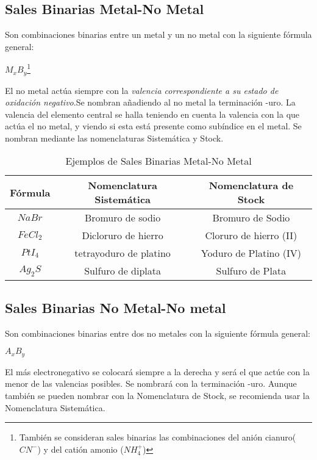 \documentclass[11pt,fleqn]{book} %
\begin{document}
\subsection{Sales Binarias Metal-No Metal}
Son combinaciones binarias entre un metal y un no metal con la siguiente fórmula general:\\
\begin{center}
$M_{x}B_y$\footnote{También se consideran sales binarias las combinaciones del anión cianuro($CN^{-}$) y del catión amonio ($NH^{+}_4$)}
\end{center}
El no metal actúa siempre con la \emph{valencia correspondiente a su estado de oxidación negativo}.Se nombran añadiendo al no metal la terminación -uro. La valencia del elemento central se halla teniendo en cuenta la valencia con la que actúa el no metal, y viendo si esta está presente como subíndice en el metal. Se nombran mediante las nomenclaturas Sistemática y Stock.
\begin{table}[h!]
	\centering
	\begin{tabular}{c|cc}
		Fórmula&Nomenclatura Sistemática&Nomenclatura de Stock\\ \hline
		$NaBr$&Bromuro de sodio&Bromuro de Sodio\\ 
		$FeCl_{2}$&Dicloruro de hierro&Cloruro de hierro (II)\\
		$PtI_{4}$&tetrayoduro de platino&Yoduro de Platino (IV)\\
		$Ag_{2}S$&Sulfuro de diplata&Sulfuro de Plata\\ \hline
	\end{tabular}
	\caption{Ejemplos de Sales Binarias Metal-No Metal}
\end{table}
\subsection{Sales Binarias No Metal-No metal}
Son combinaciones binarias entre dos no metales con la siguiente fórmula general:\\
\begin{center}
	$A_{x}B_y$
\end{center}
El más electronegativo se colocará siempre a la derecha y será el que actúe con la menor de las valencias posibles. Se nombrará con la terminación -uro. Aunque también se pueden nombrar con la Nomenclatura de Stock, se recomienda usar la Nomenclatura Sistemática. 
\end{document}

